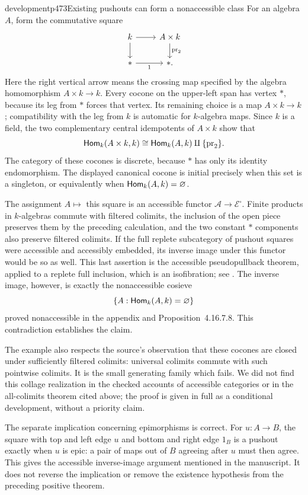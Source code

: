 \begin{dcomment}{development}{p473}{Existing pushouts can form a nonaccessible class}
For an algebra $A$, form the commutative square
\[
 \begin{tikzcd}
 k \arrow[r] \arrow[d] & A\times k \arrow[d,"\operatorname{pr}_2"]\\
 * \arrow[r,"1"'] & * .
 \end{tikzcd}
\]
Here the right vertical arrow means the crossing map specified by the algebra homomorphism $A\times k\to k$. Every cocone on the upper-left span has vertex $*$, because its leg from $*$ forces that vertex. Its remaining choice is a map $A\times k\to k$; compatibility with the leg from $k$ is automatic for $k$-algebra maps. Since $k$ is a field, the two complementary central idempotents of $A\times k$ show that
\[
 \mathsf{Hom}_k(A\times k,k)
 \cong\mathsf{Hom}_k(A,k)\amalg\{\operatorname{pr}_2\}.
\]
The category of these cocones is discrete, because $*$ has only its identity endomorphism. The displayed canonical cocone is initial precisely when this set is a singleton, or equivalently when $\mathsf{Hom}_k(A,k)=\varnothing$.

The assignment $A\mapsto$ this square is an accessible functor $\mathcal A\to\mathcal E^\square$. Finite products in $k$-algebras commute with filtered colimits, the inclusion of the open piece preserves them by the preceding calculation, and the two constant $*$ components also preserve filtered colimits. If the full replete subcategory of pushout squares were accessible and accessibly embedded, its inverse image under this functor would be so as well. This last assertion is the accessible pseudopullback theorem, applied to a replete full inclusion, which is an isofibration; see \citet[Remark~4.9]{BourkeLack2024}. The inverse image, however, is exactly the nonaccessible cosieve
\[
 \{A:\mathsf{Hom}_k(A,k)=\varnothing\}
\]
proved nonaccessible in the appendix and Proposition~4.16.7.8. This contradiction establishes the claim.

The example also respects the source's observation that these cocones are closed under sufficiently filtered colimits: universal colimits commute with such pointwise colimits. It is the small generating family which fails. We did not find this collage realization in the checked accounts of accessible categories or in the all-colimits theorem cited above; the proof is given in full as a conditional development, without a priority claim.

The separate implication concerning epimorphisms is correct. For $u:A\to B$, the square with top and left edge $u$ and bottom and right edge $1_B$ is a pushout exactly when $u$ is epic: a pair of maps out of $B$ agreeing after $u$ must then agree. This gives the accessible inverse-image argument mentioned in the manuscript. It does not reverse the implication or remove the existence hypothesis from the preceding positive theorem.
\end{dcomment}


